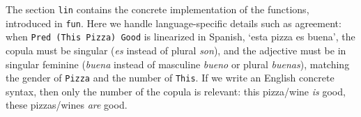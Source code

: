 \documentclass[11pt]{article}
\def\t#1{\texttt{#1}}
\begin{document}
The section \t{lin} contains the concrete implementation of the
functions, introduced in \t{fun}. Here we handle
language-specific details such as agreement: when \t{Pred (This Pizza)
  Good} is linearized in Spanish, `esta pizza es buena', the copula must be singular
(\emph{es} instead of plural \emph{son}), and the adjective must be in singular
feminine (\emph{buena} instead of masculine \emph{bueno} or plural
\emph{buenas}), matching the gender of \t{Pizza} and the number of \t{This}. 
If we write an English concrete syntax, then only the number of the copula is
relevant: this pizza/wine \emph{is} good, these pizzas/wines \emph{are} good.
\begin{figure}[]
\centering
\begin{Shaded}
\begin{Highlighting}[]
   \FunctionTok{=} \NormalTok{\{}
     \FunctionTok{=}  \NormalTok{;}
     \FunctionTok{=} \OtherTok{:}  \OtherTok{:}  \OtherTok{:}  \NormalTok{\} ;}
     \FunctionTok{=} \OtherTok{:}  \OtherTok{=>}  \OtherTok{:}  \NormalTok{\} ;}
     \FunctionTok{=} \OtherTok{:}  \OtherTok{=>}  \OtherTok{=>}  \OtherTok{:}  \NormalTok{\} ;}
     \FunctionTok{=} \FunctionTok{++} \FunctionTok{!} \FunctionTok{++} \FunctionTok{!} \FunctionTok{!} 
     \FunctionTok{=}    
     \FunctionTok{=}    
     \FunctionTok{=} \FunctionTok{=} \OtherTok{=>} \FunctionTok{!} \FunctionTok{!} \FunctionTok{!} 

\end{Highlighting}
\end{Shaded}
\end{figure}
\end{document}

